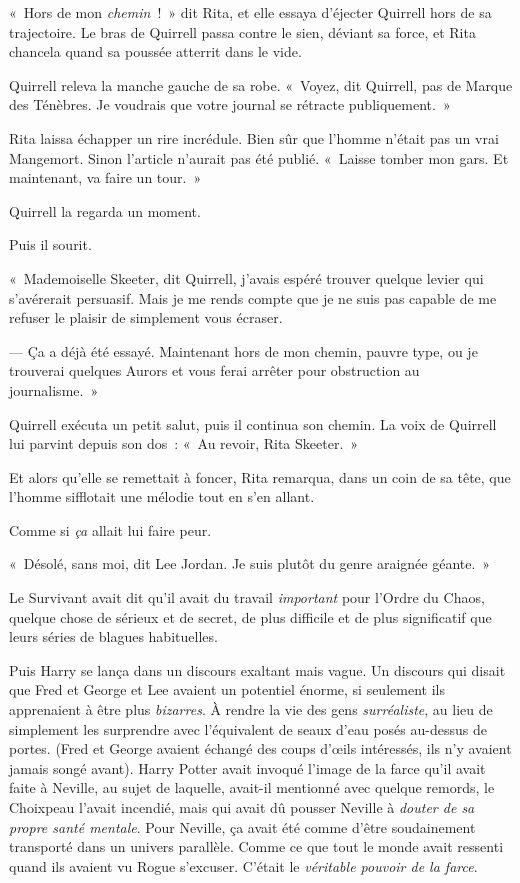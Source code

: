 «~Hors de mon \emph{chemin}~!~»
dit Rita, et elle essaya d'éjecter Quirrell hors de sa trajectoire.
Le bras de Quirrell passa contre le sien, déviant sa force, et Rita chancela quand sa poussée atterrit dans le vide.

Quirrell releva la manche gauche de sa robe.
«~Voyez, dit Quirrell, pas de Marque des Ténèbres.
Je voudrais que votre journal se rétracte publiquement.~»

Rita laissa échapper un rire incrédule.
Bien sûr que l'homme n'était pas un vrai Mangemort.
Sinon l'article n'aurait pas été publié.
«~Laisse tomber mon gars.
Et maintenant, va faire un tour.~»

Quirrell la regarda un moment.

Puis il sourit.

«~Mademoiselle Skeeter, dit Quirrell, j'avais espéré trouver quelque levier qui s'avérerait persuasif.
Mais je me rends compte que je ne suis pas capable de me refuser le plaisir de simplement vous écraser.

--- Ça a déjà été essayé.
Maintenant hors de mon chemin, pauvre type, ou je trouverai quelques Aurors et vous ferai arrêter pour obstruction au journalisme.~»

Quirrell exécuta un petit salut, puis il continua son chemin.
La voix de Quirrell lui parvint depuis son dos~: «~Au revoir, Rita Skeeter.~»

Et alors qu'elle se remettait à foncer, Rita remarqua, dans un coin de sa tête, que l'homme sifflotait une mélodie tout en s'en allant.

Comme si \emph{ça} allait lui faire peur.


«~Désolé, sans moi, dit Lee Jordan.
Je suis plutôt du genre araignée géante.~»

Le Survivant avait dit qu'il avait du travail \emph{important} pour l'Ordre du Chaos, quelque chose de sérieux et de secret, de plus difficile et de plus significatif que leurs séries de blagues habituelles.

Puis Harry se lança dans un discours exaltant mais vague.
Un discours qui disait que Fred et George et Lee avaient un potentiel énorme, si seulement ils apprenaient à être plus \emph{bizarres}.
À rendre la vie des gens \emph{surréaliste}, au lieu de simplement les surprendre avec l'équivalent de seaux d'eau posés au-dessus de portes.
(Fred et George avaient échangé des coups d'œils intéressés, ils n'y avaient jamais songé avant).
Harry Potter avait invoqué l'image de la farce qu'il avait faite à Neville, au sujet de laquelle, avait-il mentionné avec quelque remords, le Choixpeau l'avait incendié, mais qui avait dû pousser Neville à \emph{douter de sa propre santé mentale}.
Pour Neville, ça avait été comme d'être soudainement transporté dans un univers parallèle.
Comme ce que tout le monde avait ressenti quand ils avaient vu Rogue s'excuser.
C'était le \emph{véritable pouvoir de la farce}.

